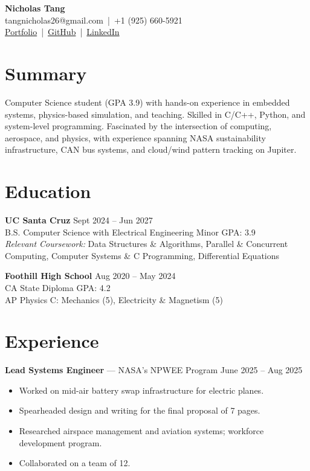 \documentclass[a4paper,10pt]{article}
\begin{document}

\begin{center}
    {\LARGE \textbf{Nicholas Tang}} \\ [0.5em]
    tangnicholas26@gmail.com \,|\, +1 (925) 660-5921 \\ [0.3em]
    \href{https://nicholas-tangerine.github.io}{Portfolio} \,|\, 
    \href{https://github.com/nicholas-tangerine}{GitHub} \,|\, 
    \href{https://linkedin.com/in/nicholas-tangerine}{LinkedIn}
\end{center}

\section*{Summary}
Computer Science student (GPA 3.9) with hands-on experience in embedded systems, physics-based simulation, and teaching. Skilled in C/C++, Python, and system-level programming. Fascinated by the intersection of computing, aerospace, and physics, with experience spanning NASA sustainability infrastructure, CAN bus systems, and cloud/wind pattern tracking on Jupiter.

\section*{Education}
\textbf{UC Santa Cruz} \hfill Sept 2024 -- Jun 2027 \\
B.S. Computer Science with Electrical Engineering Minor \hfill GPA: 3.9 \\
\textit{Relevant Coursework:} Data Structures \& Algorithms, Parallel \& Concurrent \\ 
Computing, Computer Systems \& C Programming, Differential Equations

\vspace{0.5em}
\textbf{Foothill High School} \hfill Aug 2020 -- May 2024 \\
CA State Diploma \hfill GPA: 4.2 \\
AP Physics C: Mechanics (5), Electricity \& Magnetism (5)

\section*{Experience}
\textbf{Lead Systems Engineer} --- NASA's NPWEE Program \hfill June 2025 -- Aug 2025
\begin{itemize}
    \item Worked on mid-air battery swap infrastructure for electric planes.
    \item Spearheaded design and writing for the final proposal of 7 pages.
    \item Researched airspace management and aviation systems; workforce development program.
    \item Collaborated on a team of 12.
\end{itemize}
\end{document}
